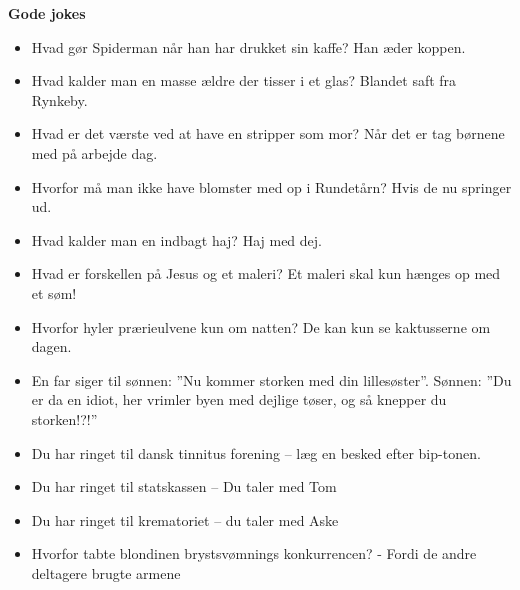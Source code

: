 \documentclass[../../../main.tex]{subfiles}
\begin{document}
\textbf{Gode jokes}
\begin{itemize}
  \item Hvad gør Spiderman når han har drukket sin kaffe? Han æder koppen.
  \item Hvad kalder man en masse ældre der tisser i et glas? Blandet saft fra Rynkeby.
  \item Hvad er det værste ved at have en stripper som mor? Når det er tag børnene med på arbejde dag.
  \item Hvorfor må man ikke have blomster med op i Rundetårn? Hvis de nu springer ud.
  \item Hvad kalder man en indbagt haj? Haj med dej.
  \item Hvad er forskellen på Jesus og et maleri? Et maleri skal kun hænges op med et søm!
  \item Hvorfor hyler prærieulvene kun om natten? De kan kun se kaktusserne om dagen.
  \item En far siger til sønnen: ''Nu kommer storken med din lillesøster''. Sønnen: ''Du er da en idiot, her vrimler byen med dejlige tøser, og så knepper du storken!?!''
  \item Du har ringet til dansk tinnitus forening – læg en besked efter bip-tonen.
  \item Du har ringet til statskassen – Du taler med Tom
  \item Du har ringet til krematoriet – du taler med Aske
  \item Hvorfor tabte blondinen brystsvømnings konkurrencen? - Fordi de andre deltagere brugte armene
\end{itemize}
\end{document}

